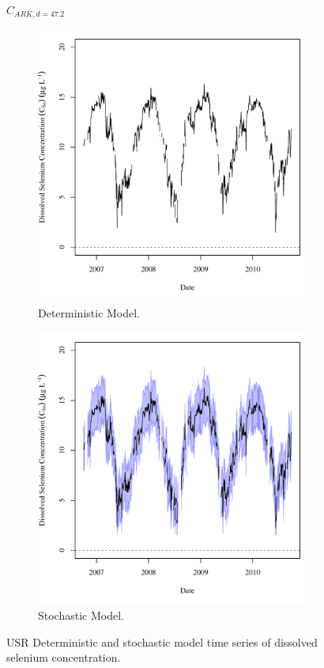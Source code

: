 \subfiguremid
\begin{landscape}
	\begin{figure}
		$ C_{ARK,d=47.2} $
		\begin{subfigure}{0.7\textwidth}
			\centering
			\includegraphics[width=\tableCustomSize]{"Figures/Results_USR/Deterministic/c TS FLY"}
			\caption{Deterministic Model.}
		\end{subfigure}%
		\begin{subfigure}{0.7\textwidth}
			\centering
			\includegraphics[width=\tableCustomSize]{"Figures/Results_USR/Stochastic/c TS FLY"}
			\caption{Stochastic Model.}
		\end{subfigure}
		\caption{USR Deterministic and stochastic model time series of dissolved selenium concentration.}
	\end{figure}
\end{landscape}

